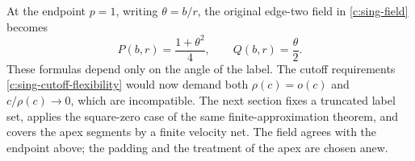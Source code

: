 At the endpoint $p=1$, writing $\theta=b/r$, the original edge-two
field in \eqref{c:sing-field} becomes
\[
 P(b,r)=\frac{1+\theta^2}{4},\qquad Q(b,r)=\frac{\theta}{2}.
\]
These formulas depend only on the angle of the label.  The cutoff
requirements \eqref{c:sing-cutoff-flexibility} would now demand both
$\rho(c)=o(c)$ and $c/\rho(c)\to0$, which are incompatible.
The next section fixes a truncated label set, applies the square-zero
case of the same finite-approximation theorem, and covers the apex
segments by a finite velocity net. The field agrees with the endpoint
above; the padding and the treatment of the apex are chosen anew.
